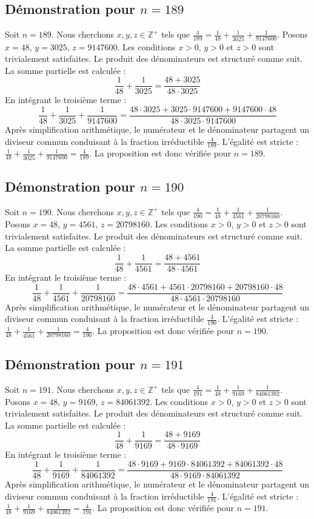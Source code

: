 \documentclass[11pt,a4paper]{article}
\begin{document}
\subsection{Démonstration pour $n = 189$}
Soit $n = 189$. Nous cherchons $x, y, z \in \mathbb{Z}^{+}$ tels que $\frac{4}{189} = \frac{1}{48} + \frac{1}{3025} + \frac{1}{9147600}$.
Posons $x = 48$, $y = 3025$, $z = 9147600$.
Les conditions $x > 0$, $y > 0$ et $z > 0$ sont trivialement satisfaites.
Le produit des dénominateurs est structuré comme suit. La somme partielle est calculée :
$$ \frac{1}{48} + \frac{1}{3025} = \frac{48+3025}{48 \cdot 3025} $$
En intégrant le troisième terme :
$$ \frac{1}{48} + \frac{1}{3025} + \frac{1}{9147600} = \frac{48 \cdot 3025 + 3025 \cdot 9147600 + 9147600 \cdot 48}{48 \cdot 3025 \cdot 9147600} $$
Après simplification arithmétique, le numérateur et le dénominateur partagent un diviseur commun conduisant à la fraction irréductible $\frac{4}{189}$.
L'égalité est stricte : $\frac{1}{48} + \frac{1}{3025} + \frac{1}{9147600} = \frac{4}{189}$.
La proposition est donc vérifiée pour $n = 189$.
\subsection{Démonstration pour $n = 190$}
Soit $n = 190$. Nous cherchons $x, y, z \in \mathbb{Z}^{+}$ tels que $\frac{4}{190} = \frac{1}{48} + \frac{1}{4561} + \frac{1}{20798160}$.
Posons $x = 48$, $y = 4561$, $z = 20798160$.
Les conditions $x > 0$, $y > 0$ et $z > 0$ sont trivialement satisfaites.
Le produit des dénominateurs est structuré comme suit. La somme partielle est calculée :
$$ \frac{1}{48} + \frac{1}{4561} = \frac{48+4561}{48 \cdot 4561} $$
En intégrant le troisième terme :
$$ \frac{1}{48} + \frac{1}{4561} + \frac{1}{20798160} = \frac{48 \cdot 4561 + 4561 \cdot 20798160 + 20798160 \cdot 48}{48 \cdot 4561 \cdot 20798160} $$
Après simplification arithmétique, le numérateur et le dénominateur partagent un diviseur commun conduisant à la fraction irréductible $\frac{4}{190}$.
L'égalité est stricte : $\frac{1}{48} + \frac{1}{4561} + \frac{1}{20798160} = \frac{4}{190}$.
La proposition est donc vérifiée pour $n = 190$.
\subsection{Démonstration pour $n = 191$}
Soit $n = 191$. Nous cherchons $x, y, z \in \mathbb{Z}^{+}$ tels que $\frac{4}{191} = \frac{1}{48} + \frac{1}{9169} + \frac{1}{84061392}$.
Posons $x = 48$, $y = 9169$, $z = 84061392$.
Les conditions $x > 0$, $y > 0$ et $z > 0$ sont trivialement satisfaites.
Le produit des dénominateurs est structuré comme suit. La somme partielle est calculée :
$$ \frac{1}{48} + \frac{1}{9169} = \frac{48+9169}{48 \cdot 9169} $$
En intégrant le troisième terme :
$$ \frac{1}{48} + \frac{1}{9169} + \frac{1}{84061392} = \frac{48 \cdot 9169 + 9169 \cdot 84061392 + 84061392 \cdot 48}{48 \cdot 9169 \cdot 84061392} $$
Après simplification arithmétique, le numérateur et le dénominateur partagent un diviseur commun conduisant à la fraction irréductible $\frac{4}{191}$.
L'égalité est stricte : $\frac{1}{48} + \frac{1}{9169} + \frac{1}{84061392} = \frac{4}{191}$.
La proposition est donc vérifiée pour $n = 191$.
\end{document}
